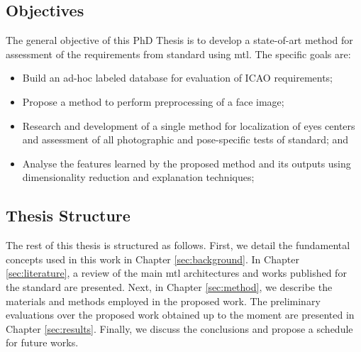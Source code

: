 \subsection{Objectives}	

The general objective of this PhD Thesis is to develop a state-of-art method for assessment of the requirements from \icao standard using \acl{mtl}. The specific goals are:

\begin{itemize}
\item Build an ad-hoc labeled database for evaluation of ICAO requirements;
\item Propose a method to perform preprocessing of a face image;
\item Research and development of a single method for localization of eyes centers and assessment of all photographic and pose-specific tests of \icao standard; and
\item Analyse the features learned by the proposed method and its outputs using dimensionality reduction and explanation techniques;
\end{itemize}

\subsection{Thesis Structure}

The rest of this thesis is structured as follows. First, we detail the fundamental concepts used in this work in Chapter \ref{sec:background}. In Chapter \ref{sec:literature}, a review of the main \acl{mtl} architectures and works published for the \icao standard are presented. Next, in Chapter \ref{sec:method}, we describe the materials and methods employed in the proposed work. The preliminary evaluations over the proposed work obtained up to the moment are presented in Chapter \ref{sec:results}. Finally, we discuss the conclusions and propose a schedule for future works.

